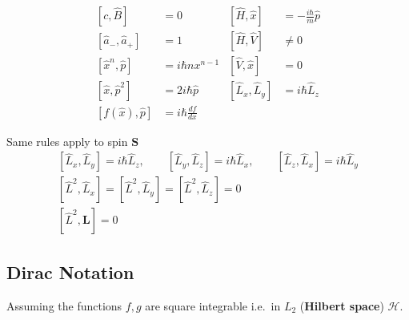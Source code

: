 \noindent\begin{align*}
    \left[c,\hat B\right]                        & =0                     & \left[\widehat{H},\widehat{x}\right]     & =-\frac{i\hbar}{m}\widehat{p} \\
    \left[\widehat{a}_{-},\widehat{a}_{+}\right] & = 1                    & \left[\widehat{H}, \widehat{V}\right]    & \neq 0                        \\
    \left[\widehat{x}^n,\widehat{p}\right]       & = i \hbar n x^{n-1}    & \left[\widehat{V},\widehat{x}\right]     & =0                            \\
    \left[\widehat{x},\widehat{p}^2\right]       & = 2i\hbar\widehat{p}   & \left[\widehat{L}_x,\widehat{L}_y\right] & =i\hbar\widehat{L}_z          \\
    \left[f(\widehat{x}),\widehat{p}\right]      & = i \hbar\frac{df}{dx} &                                          &
\end{align*}


\label{ang_mom_comm}

Same rules apply to spin $\mathbf{S}$
\noindent\begin{gather*}
    \left[\widehat{L}_{x},\widehat{L}_{y}\right] =i\hbar \widehat{L}_{z}, \qquad \left[\widehat{L}_{y},\widehat{L}_{z}\right]  =i\hbar \widehat{L}_{x}, \qquad \left[\widehat{L}_{z},\widehat{L}_{x}\right]  =i\hbar \widehat{L}_{y}      \\
    \left[\widehat{L}^{2},\widehat{L}_{x}\right] = \left[\widehat{L}^{2},\widehat{L}_{y}\right] = \left[\widehat{L}^{2},\widehat{L}_{z}\right] = 0\\
    \left[\widehat{L}^2, \mathbf{L}\right]=0
\end{gather*}

\subsection{Dirac Notation}
Assuming the functions $f,g$ are square integrable i.e.\ in $L_2$ (\textbf{Hilbert space}) $\mathcal{H}$.

